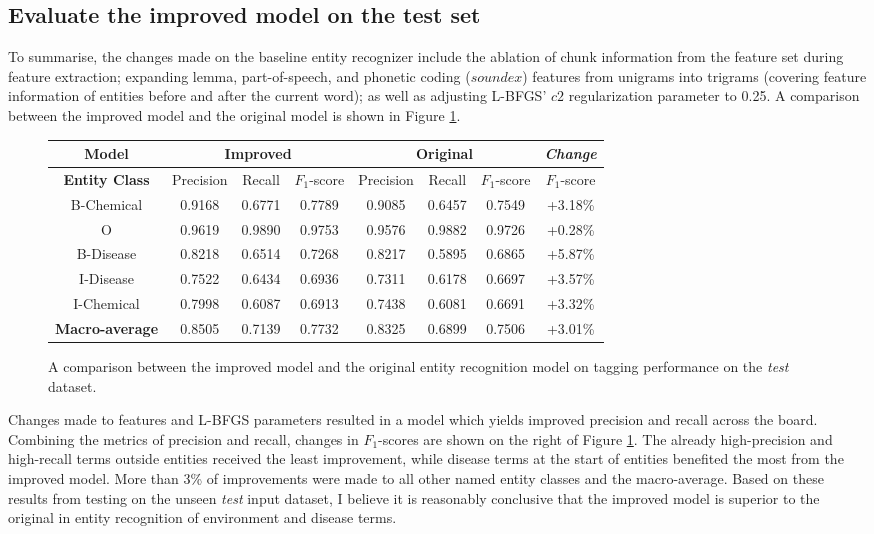 \documentclass[10pt, oneside]{article}
\begin{document}
\subsection{Evaluate the improved model on the test set}

To summarise, the changes made on the baseline entity recognizer include the ablation of chunk information from the feature set during feature extraction; expanding lemma, part-of-speech, and phonetic coding ($soundex$) features from unigrams into trigrams (covering feature information of entities before and after the current word); as well as adjusting L-BFGS' $c2$ regularization parameter to 0.25. A comparison between the improved model and the original model is shown in Figure \ref{fig:improved-compare}.

\begin{figure}[h]
\begin{center}
\fontsize{9}{11}\selectfont
\begin{tabular}{|*{7}{c|}|c|}\hline
\textbf{Model}  & \multicolumn{3}{c|}{\textbf{Improved}} & \multicolumn{3}{c||}{\textbf{Original}} & \emph{Change} \\ \hline 
\textbf{Entity Class} & Precision & Recall & $F_1$-score & Precision & Recall & $F_1$-score & $F_1$-score \\ \hline
B-Chemical & 0.9168 & 0.6771 & 0.7789 & 0.9085 & 0.6457 & 0.7549 & +3.18\% \\ \hline
O                 & 0.9619 & 0.9890 & 0.9753 & 0.9576 & 0.9882 & 0.9726 & +0.28\% \\ \hline
B-Disease   & 0.8218 & 0.6514 & 0.7268 & 0.8217 & 0.5895 & 0.6865 & +5.87\% \\ \hline
I-Disease    & 0.7522 & 0.6434 & 0.6936 & 0.7311 & 0.6178 & 0.6697 & +3.57\% \\ \hline
I-Chemical  & 0.7998 & 0.6087 & 0.6913 & 0.7438 & 0.6081 & 0.6691 & +3.32\% \\ \hline
\textbf{Macro-average} & 0.8505 & 0.7139 & 0.7732 & 0.8325 & 0.6899 & 0.7506 & +3.01\% \\ \hline
\end{tabular}
\caption{\label{fig:improved-compare} A comparison between the improved model and the original entity recognition model on tagging performance on the \emph{test} dataset.}
\end{center}
\end{figure}

Changes made to features and L-BFGS parameters resulted in a model which yields improved precision and recall across the board. Combining the metrics of precision and recall, changes in $F_1$-scores are shown on the right of Figure \ref{fig:improved-compare}. The already high-precision and high-recall terms outside entities received the least improvement, while disease terms at the start of entities benefited the most from the improved model. More than 3\% of improvements were made to all other named entity classes and the macro-average. Based on these results from testing on the unseen \emph{test} input dataset, I believe it is reasonably conclusive that the improved model is superior to the original in entity recognition of environment and disease terms.
\end{document}
